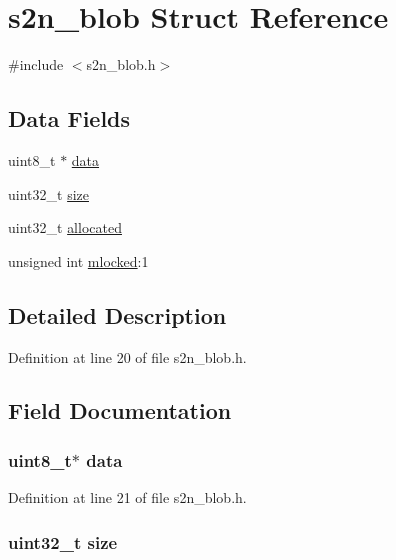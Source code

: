 \hypertarget{structs2n__blob}{}\section{s2n\+\_\+blob Struct Reference}
\label{structs2n__blob}


{\ttfamily \#include $<$s2n\+\_\+blob.\+h$>$}

\subsection*{Data Fields}
\begin{DoxyCompactItemize}
\item 
uint8\+\_\+t $\ast$ \hyperlink{structs2n__blob_abe222f6d3581e7920dcad5306cc906a8}{data}
\item 
uint32\+\_\+t \hyperlink{structs2n__blob_ab2c6b258f02add8fdf4cfc7c371dd772}{size}
\item 
uint32\+\_\+t \hyperlink{structs2n__blob_a9ffa331535fe886bb8208ccee04393db}{allocated}
\item 
unsigned int \hyperlink{structs2n__blob_aadc4831179870523e92ff16734a830ea}{mlocked}\+:1
\end{DoxyCompactItemize}


\subsection{Detailed Description}


Definition at line 20 of file s2n\+\_\+blob.\+h.



\subsection{Field Documentation}
\subsubsection[{\texorpdfstring{data}{data}}]{\setlength{\rightskip}{0pt plus 5cm}uint8\+\_\+t$\ast$ data}\hypertarget{structs2n__blob_abe222f6d3581e7920dcad5306cc906a8}{}\label{structs2n__blob_abe222f6d3581e7920dcad5306cc906a8}


Definition at line 21 of file s2n\+\_\+blob.\+h.

\subsubsection[{\texorpdfstring{size}{size}}]{\setlength{\rightskip}{0pt plus 5cm}uint32\+\_\+t size}\hypertarget{structs2n__blob_ab2c6b258f02add8fdf4cfc7c371dd772}{}\label{structs2n__blob_ab2c6b258f02add8fdf4cfc7c371dd772}


